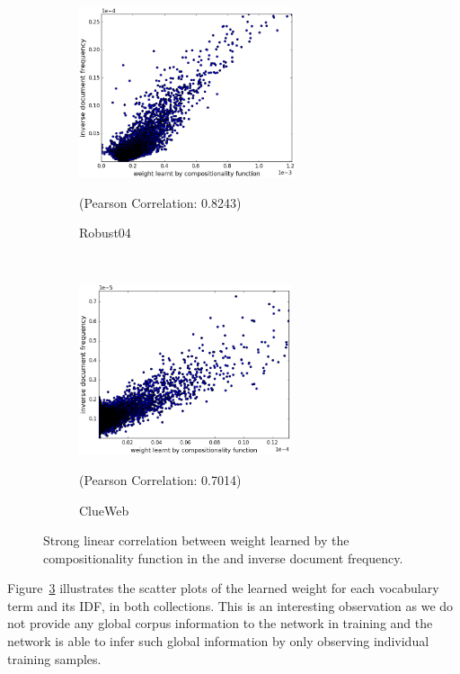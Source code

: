 \begin{figure}[!t]%
    \centering
    \begin{subfigure}[t]{0.45\textwidth}
        \centering
        \includegraphics[height=5cm]{03-part-02/chapter-04/figs_and_tables/plot_composionality_idf_scatter_robust.png}
        \caption{\label{fig:scatter_r}Robust04}{\scriptsize{(Pearson Correlation: 0.8243)}}
    \end{subfigure}%
    ~
    \begin{subfigure}[t]{0.45\textwidth}
        \centering
        \includegraphics[height=5cm]{03-part-02/chapter-04/figs_and_tables/plot_composionality_idf_scatter_clueweb.png}
        \caption{\label{fig:scatter_c}ClueWeb}{\scriptsize{(Pearson Correlation: 0.7014)}}
    \end{subfigure}%
    \caption{\label{fig:scatter}Strong linear correlation between weight learned by the compositionality function in the \feedthree and inverse document frequency.}
\end{figure}
%
Figure~\ref{fig:scatter} illustrates the scatter plots of the learned weight for each vocabulary term and its IDF, in both collections.
This is an interesting observation as we do not provide any global corpus information to the network in training and the network is able to infer such global information by only observing individual training samples.


